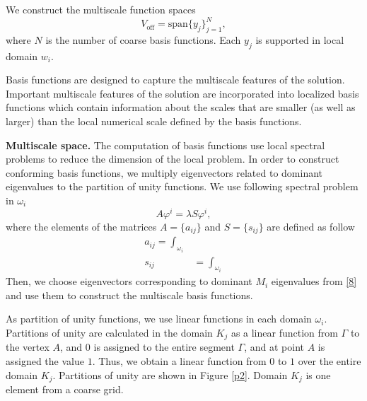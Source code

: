 \documentclass[authoryear]{elsarticle}
\begin{document}
We construct the multiscale function spaces
\[
	{V}_{\text{off}} = \mbox{span} \{y_{j}\}_{j=1}^{N},
\]
where $N$ is the number of coarse basis functions.
Each $y_j$ is supported in local domain $w_i$.

Basis functions are designed to capture the multiscale features of the solution. 
Important multiscale features of the solution are incorporated into localized basis functions which contain information about the scales that are smaller (as well as larger) than the local numerical scale defined by the basis functions. 
 
\textbf{Multiscale space.}
The computation of basis functions use local spectral problems to reduce the dimension of the local problem. 
In order to construct conforming basis functions, we multiply eigenvectors related to dominant eigenvalues to the partition of unity functions.
We use following spectral problem in $\omega_i$
\begin{equation}\label{8}
	A \varphi^i = \lambda S \varphi^i,
\end{equation} 
where the elements of the matrices $A = \{a_{ij}\}$ and $S = \{s_{ij}\}$ are defined as follow{
\begin{equation}\label{9}
\begin{split}
	a_{ij} = 
	\int_{\omega_i} \\
	s_{ij} & = \int_{\omega _i}
\end{split}
\end{equation}}
Then, we choose eigenvectors corresponding to dominant $M_{i}$ eigenvalues from \eqref{8} and use them to construct the multiscale basis functions.

As partition of unity functions, we use linear functions in each domain $\omega_i$.
Partitions of unity are calculated in the domain $K_j$ as a linear function from $\Gamma$ to the vertex $A$, and $0$ is assigned to the entire segment $\Gamma$, and at point $A$ is assigned the value $1$. 
Thus, we obtain a linear function from $0$ to $1$ over the entire domain $K_j$. 
Partitions of unity are shown in Figure \ref{p2}. 
Domain $K_j$ is one element from a coarse grid. 
\end{document}
